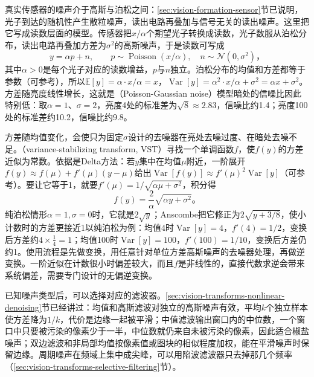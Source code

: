 真实传感器的噪声介于高斯与泊松之间：\ref{sec:vision-formation-sensor}节已说明，光子到达的随机性产生散粒噪声，读出电路再叠加与信号无关的读出噪声。这里把它写成读数层面的模型。传感器把$x/\alpha$个期望光子转换成读数，光子数服从泊松分布，读出电路再叠加方差为$\sigma^2$的高斯噪声，于是读数可写成
\begin{equation}
 y=\alpha p+n,\qquad
 p\sim\operatorname{Poisson}(x/\alpha),\quad
 n\sim\mathcal{N}(0,\sigma^2)\text{，}
 \label{eq:vision-poisson-gaussian}
\end{equation}
其中$\alpha>0$是每个光子对应的读数增益，$p$与$n$独立。泊松分布的均值和方差都等于参数（可参考），所以$\mathbb{E}[y]=\alpha\cdot x/\alpha=x$，$\operatorname{Var}[y]=\alpha^2\cdot x/\alpha+\sigma^2=\alpha x+\sigma^2$。方差随亮度线性增长，这就是（Poisson-Gaussian noise）模型暗处的信噪比因此特别低：取$\alpha=1$、$\sigma=2$，亮度4处的标准差为$\sqrt{8}\approx2.83$，信噪比约1.4；亮度100处的标准差约10.2，信噪比约9.8。

方差随均值变化，会使只为固定$\sigma$设计的去噪器在亮处去噪过度、在暗处去噪不足。（variance-stabilizing transform, VST）寻找一个单调函数$f$，使$f(y)$的方差近似为常数。依据是Delta方法：若$y$集中在均值$\mu$附近，一阶展开$f(y)\approx f(\mu)+f'(\mu)(y-\mu)$给出$\operatorname{Var}[f(y)]\approx f'(\mu)^2\operatorname{Var}[y]$（可参考）。要让它等于1，就要$f'(\mu)=1/\sqrt{\alpha\mu+\sigma^2}$，积分得
\begin{equation}
 f(y)=\frac{2}{\alpha}\sqrt{\alpha y+\sigma^2}\text{。}
 \label{eq:vision-vst}
\end{equation}
纯泊松情形$\alpha=1,\sigma=0$时，它就是$2\sqrt{y}$；Anscombe把它修正为$2\sqrt{y+3/8}$，使小计数时的方差更接近1以纯泊松为例：均值4时$\operatorname{Var}[y]=4$，$f'(4)=1/2$，变换后方差约$4\times\frac14=1$；均值100时$\operatorname{Var}[y]=100$，$f'(100)=1/10$，变换后方差仍约1。使用流程是先做变换，用任意针对单位方差高斯噪声的去噪器处理，再做逆变换。一阶近似在计数很小时偏差较大，而且$f$是非线性的，直接代数求逆会带来系统偏差，需要专门设计的无偏逆变换。

已知噪声类型后，可以选择对应的滤波器。\ref{sec:vision-transforms-nonlinear-denoising}节已经讲过：均值和高斯滤波对独立的高斯噪声有效，平均$k$个独立样本使方差降为$1/k$，代价是边缘一起被平滑；中值滤波输出窗口内的中位数，一个窗口中只要被污染的像素少于一半，中位数就仍来自未被污染的像素，因此适合椒盐噪声；双边滤波和非局部均值按像素值或图块的相似程度加权，能在平滑噪声时保留边缘。周期噪声在频域上集中成尖峰，可以用陷波滤波器只去掉那几个频率（\ref{sec:vision-transforms-selective-filtering}节）。

